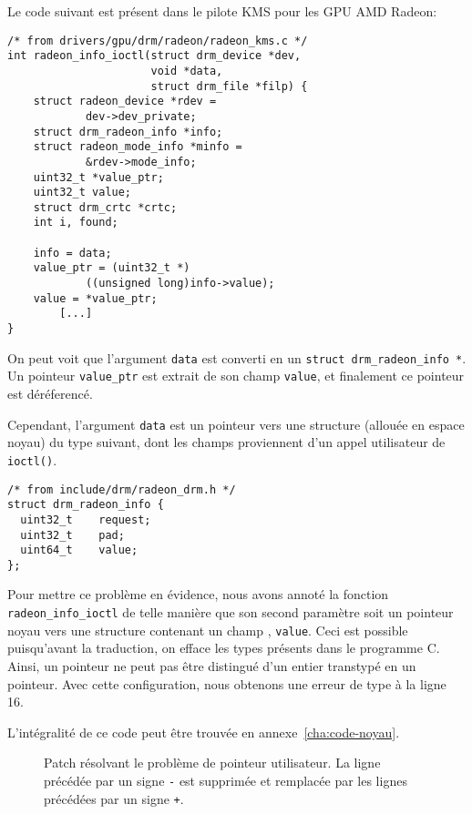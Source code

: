Le code suivant est présent dans le pilote KMS pour les GPU AMD Radeon:

\begin{verbatim}
/* from drivers/gpu/drm/radeon/radeon_kms.c */
int radeon_info_ioctl(struct drm_device *dev,
                      void *data,
                      struct drm_file *filp) {
	struct radeon_device *rdev =
            dev->dev_private;
	struct drm_radeon_info *info;
	struct radeon_mode_info *minfo =
            &rdev->mode_info;
	uint32_t *value_ptr;
	uint32_t value;
	struct drm_crtc *crtc;
	int i, found;

	info = data;
	value_ptr = (uint32_t *)
            ((unsigned long)info->value);
	value = *value_ptr;
        [...]
}
\end{verbatim}

On peut voit que l'argument \texttt{data} est converti en un \texttt{struct
drm\_radeon\_info *}. Un pointeur \texttt{value\_ptr} est extrait de son champ
\texttt{value}, et finalement ce pointeur est déréferencé.

Cependant, l'argument \texttt{data} est un pointeur vers une structure (allouée
en espace noyau) du type suivant, dont les champs proviennent d'un appel
utilisateur de \verb!ioctl()!.

\begin{verbatim}
/* from include/drm/radeon_drm.h */
struct drm_radeon_info {
  uint32_t    request;
  uint32_t    pad;
  uint64_t    value;
};
\end{verbatim}

Pour mettre ce problème en évidence, nous avons annoté la fonction
\texttt{radeon\_info\_ioctl} de telle manière que son second paramètre soit un
pointeur noyau vers une structure contenant un champ \qUser, \texttt{value}.
Ceci est possible puisqu'avant la traduction, on efface les types présents dans
le programme C. Ainsi, un pointeur ne peut pas être distingué d'un entier
transtypé en un pointeur. Avec cette configuration, nous obtenons une erreur de
type à la ligne 16.

L'intégralité de ce code peut être trouvée en annexe~\ref{cha:code-noyau}.

\begin{figure}

  \caption[Patch résolvant le problème de pointeur utilisateur.]
      {Patch résolvant le problème de pointeur utilisateur.
       La ligne précédée par un signe \texttt{-} est supprimée et remplacée
       par les lignes précédées par un signe \texttt{+}.
      }
\label{fig:linux-patch}
\end{figure}

